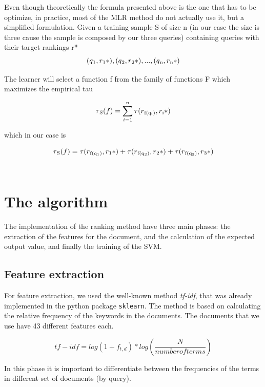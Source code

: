 \documentclass{article}
\begin{document}
Even though theoretically the formula presented above is the one that has to be optimize, in practice, most of the MLR method do not actually use it, but a simplified formulation.
Given a training sample S of size n (in our case the size is three cause the sample is composed by our three queries) containing queries with their target rankings r*
\[(q\textsubscript{1}, r\textsubscript{1}*), (q\textsubscript{2}, r\textsubscript{2}*), ..., (q\textsubscript{n}, r\textsubscript{n}*)\]

The learner will select a function f from the family of functions F which maximizes the empirical tau

\[\tau\textsubscript{S}(f) = \sum\limits_{i=1}^n \tau(r\textsubscript{f(q\textsubscript{i})},r\textsubscript{i}*) \]

which in our case is

\[\tau\textsubscript{S}(f) = \tau(r\textsubscript{f(q\textsubscript{1})},r\textsubscript{1}*) + \tau(r\textsubscript{f(q\textsubscript{2})},r\textsubscript{2}*) +\tau(r\textsubscript{f(q\textsubscript{3})},r\textsubscript{3}*) \]\\


\section{The algorithm}

The implementation of the ranking method have three main phases: the extraction of the features for the document, and the calculation of the expected output value, and finally the training of the SVM.

\subsection{Feature extraction}

For feature extraction, we used the well-known method \textit{tf-idf}, that was already implemented in the python package \texttt{sklearn}. The method is based on calculating the relative frequency of the keywords in the documents. The documents that we use have 43 different features each.

\begin{equation}
    tf-idf = log(1 + f_{t,d}) * log(\frac{N}{number of terms})
\end{equation}

In this phase it is important to differentiate between the frequencies of the terms in different set of documents (by query).
\end{document}
